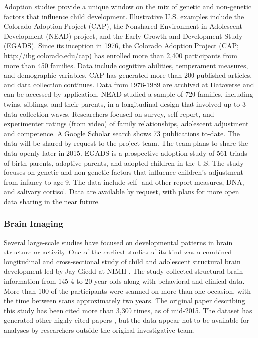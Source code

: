 \documentclass[letterpaper,man,apacite]{apa6}
\begin{document}
Adoption studies provide a unique window on the mix of genetic and non-genetic factors that influence child development.
Illustrative U.S. examples include the Colorado Adoption Project (CAP), the Nonshared Environment in Adolescent Development (NEAD) project, and the Early Growth and Development Study (EGADS).
Since its inception in 1976, the Colorado Adoption Project (CAP; \url{http://ibg.colorado.edu/cap}) has enrolled more than 2,400 participants from more than 450 families.
Data include cognitive abilities, temperament measures, and demographic variables.
CAP has generated more than 200 published articles, and data collection continues.
Data from 1976-1989 are archived at Dataverse and can be accessed by application.
NEAD studied a sample of 720 families, including twins, siblings, and their parents, in a longitudinal design that involved up to 3 data collection waves.
Researchers focused on survey, self-report, and experimenter ratings (from video) of family relationships, adolescent adjustment and competence.
A Google Scholar search shows 73 publications to-date.
The data will be shared by request to the project team.
The team plans to share the data openly later in 2015.
EGADS is a prospective adoption study of 561 triads of birth parents, adoptive parents, and adopted children in the U.S. 
The study focuses on genetic and non-genetic factors that influence children’s adjustment from infancy to age 9. 
The data include self- and other-report measures, DNA, and salivary cortisol.
Data are available by request, with plans for more open data sharing in the near future.

\subsubsection{Brain Imaging}

Several large-scale studies have focused on developmental patterns in brain structure or activity.
One of the earliest studies of its kind was a combined longitudinal and cross-sectional study of child and adolescent structural brain development led by Jay Giedd at NIMH \cite{giedd_brain_1999}.
The study collected structural brain information from 145 4 to 20-year-olds along with behavioral and clinical data.
More than 100 of the participants were scanned on more than one occasion, with the time between scans approximately two years.
The original paper describing this study has been cited more than 3,300 times, as of mid-2015.
The dataset has generated other highly cited papers \cite{gogtay_dynamic_2004}, but the data appear not to be available for analyses by researchers outside the original investigative team.
\end{document}
